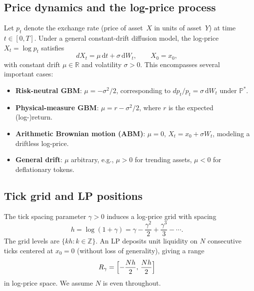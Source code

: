 \documentclass[11pt]{article}
\theoremstyle{definition}
\theoremstyle{remark}
\newcommand{\PP}{\mathbb{P}}
\newcommand{\R}{\mathbb{R}}
\newcommand{\Z}{\mathbb{Z}}
\newcommand{\dd}{\,\mathrm{d}}
\begin{document}
\subsection{Price dynamics and the log-price process}

Let $p_t$ denote the exchange rate (price of asset~$X$ in units of
asset~$Y$) at time $t \in [0, T]$. Under a general constant-drift
diffusion model, the log-price $X_t = \log p_t$ satisfies
\begin{equation}\label{eq:general_sde}
dX_t = \mu\dd t + \sigma\dd W_t, \qquad X_0 = x_0,
\end{equation}
with constant drift $\mu \in \R$ and volatility $\sigma > 0$. This
encompasses several important cases:
\begin{itemize}[nosep]
\item \textbf{Risk-neutral GBM}: $\mu = -\sigma^2/2$, corresponding
to $dp_t/p_t = \sigma\dd W_t$ under $\PP^*$.
\item \textbf{Physical-measure GBM}: $\mu = r - \sigma^2/2$, where
$r$ is the expected (log-)return.
\item \textbf{Arithmetic Brownian motion (ABM)}: $\mu = 0$,
$X_t = x_0 + \sigma W_t$, modeling a driftless log-price.
\item \textbf{General drift}: $\mu$ arbitrary, e.g.,
$\mu > 0$ for trending assets, $\mu < 0$ for deflationary tokens.
\end{itemize}

\subsection{Tick grid and LP positions}

The tick spacing parameter $\gamma > 0$ induces a log-price grid with
spacing
\begin{equation}\label{eq:h_def}
h = \log(1 + \gamma) = \gamma - \frac{\gamma^2}{2} +
\frac{\gamma^3}{3} - \cdots.
\end{equation}
The grid levels are $\{kh : k \in \Z\}$. An LP deposits unit
liquidity on $N$ consecutive ticks centered at $x_0 = 0$ (without
loss of generality), giving a range
\begin{equation}\label{eq:range}
R_\gamma = \Bigl[-\frac{Nh}{2},\, \frac{Nh}{2}\Bigr]
\end{equation}
in log-price space. We assume $N$ is even throughout.
\end{document}

